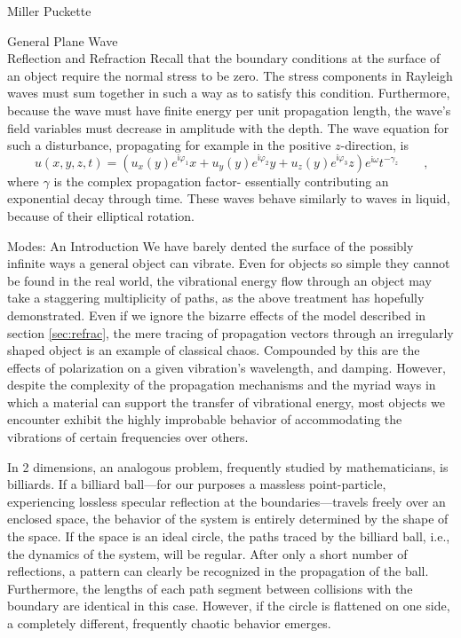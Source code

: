 \documentclass[a4paper,10pt]{report}
\numberwithin{equation}{section}
\begin{document}
\begin{chapter}{Miller Puckette}
\begin{section}{General Plane Wave \\ Reflection and Refraction}
Recall that the boundary conditions at the surface of an object require the normal stress to be zero. The stress components in Rayleigh waves must sum together in such a way as to satisfy this condition. Furthermore, because the wave must have finite energy per unit propagation length, the wave's field variables must decrease in amplitude with the depth. \cite[p.~110]{Kino1987} The wave equation for such a disturbance, propagating for example in the positive $z$-direction, is \cite[p.~70]{Ballantine1997}
\begin{equation}\label{saw}
u(x,y,z,t) = (u_x(y)e^{\mathsf{i}\varphi_1}x + u_y(y)e^{\mathsf{i}\varphi_2}y + u_z(y)e^{\mathsf{i}\varphi_3}z)e^{\mathsf{i}\omega}t^{-\gamma_z} \qquad \text{,}
\end{equation}
where $\gamma$ is the complex propagation factor- essentially contributing an exponential decay through time. \cite[p.112]{Kino1987} These waves behave similarly to waves in liquid, because of their elliptical rotation.
\end{section}
\begin{section}{Modes: An Introduction}\label{sec:modes}
 We have barely dented the surface of the possibly infinite ways a general object can vibrate. Even for objects so simple they cannot be found in the real world, the vibrational energy flow through an object may take a staggering multiplicity of paths, as the above treatment has hopefully demonstrated. Even if we ignore the bizarre effects of the model described in section \ref{sec:refrac}, the mere tracing of propagation vectors through an irregularly shaped object is an example of classical chaos. Compounded by this are the effects of polarization on a given vibration's wavelength, and damping. However, despite the complexity of the propagation mechanisms and the myriad ways in which a material can support the transfer of vibrational energy, most objects we encounter exhibit the highly improbable behavior of accommodating the vibrations of certain frequencies over others. 

In 2 dimensions, an analogous problem, frequently studied by mathematicians, is billiards. If a billiard ball---for our purposes a massless point-particle, experiencing lossless specular reflection at the boundaries---travels freely over an enclosed space, the behavior of the system is entirely determined by the shape of the space. If the space is an ideal circle, the paths traced by the billiard ball, i.e., the dynamics of the system, will be regular. After only a short number of reflections, a pattern can clearly be recognized in the propagation of the ball. Furthermore, the lengths of each path segment between collisions with the boundary are identical in this case. However, if the circle is flattened on one side, a completely different, frequently chaotic behavior emerges. \cite{Backer2007}


\end{section}
\end{chapter}
\end{document}
